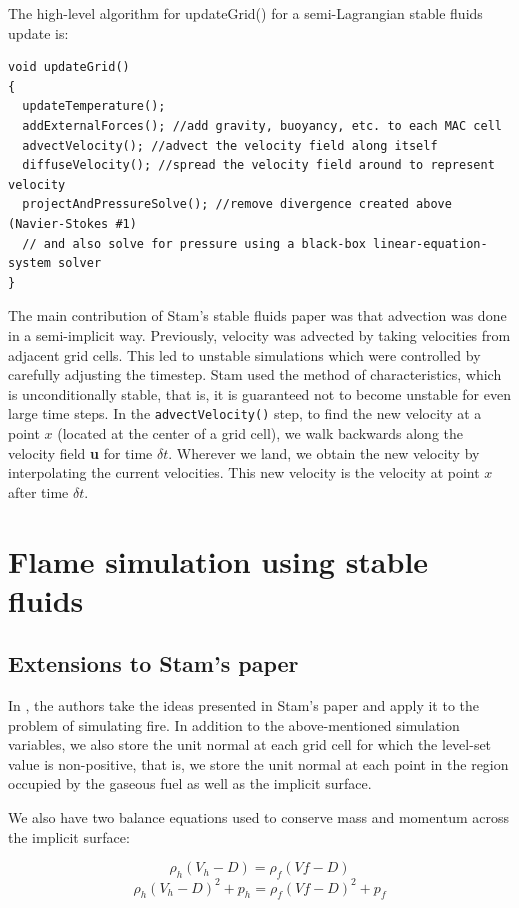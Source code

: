 \documentclass[12pt]{report}
\begin{document}
The high-level algorithm for updateGrid() for a semi-Lagrangian stable fluids update is:
\lstset{language=C++}
\begin{lstlisting}
void updateGrid()
{
  updateTemperature();
  addExternalForces(); //add gravity, buoyancy, etc. to each MAC cell
  advectVelocity(); //advect the velocity field along itself
  diffuseVelocity(); //spread the velocity field around to represent velocity
  projectAndPressureSolve(); //remove divergence created above (Navier-Stokes #1)
  // and also solve for pressure using a black-box linear-equation-system solver
}
\end{lstlisting}

The main contribution of Stam's stable fluids paper was that advection was done in a semi-implicit way. Previously, velocity was advected by taking velocities from adjacent grid cells. This led to unstable simulations which were controlled by carefully adjusting the timestep. Stam used the method of characteristics, which is unconditionally stable, that is, it is guaranteed not to become unstable for even large time steps. In the \texttt{advectVelocity()} step, to find the new velocity at a point $x$ (located at the center of a grid cell), we walk backwards along the velocity field \textbf{u} for time $\delta t$. Wherever we land, we obtain the new velocity by interpolating the current velocities. This new velocity is the velocity at point $x$ after time $\delta t$.

\section{Flame simulation using stable fluids}

\subsection{Extensions to Stam's paper}

In \cite{ngfeje}, the authors take the ideas presented in Stam's paper and apply it to the problem of simulating fire. In addition to the above-mentioned simulation variables, we also store the unit normal at each grid cell for which the level-set value is non-positive, that is, we store the unit normal at each point in the region occupied by the gaseous fuel as well as the implicit surface.

We also have two balance equations used to conserve mass and momentum across the implicit surface:

\begin{equation}
\rho_h(V_h - D) = \rho_f(Vf - D)
\end{equation}
\begin{equation}
\rho_h(V_h - D)^2 + p_h = \rho_f(Vf - D)^2 + p_f
\end{equation}
\end{document}
